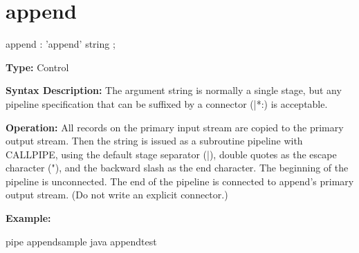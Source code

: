 \section{append}
\begin{shaded}
\begin{rail}
  append : 'append' string
  ;
\end{rail}
\end{shaded}

\textbf{Type:} Control

\textbf{Syntax Description:} The argument string is normally a single stage, but any pipeline
specification that can be suffixed by a connector (|*:) is acceptable.

\textbf{Operation:} All records on the primary input stream are copied
to the primary output stream. Then the string is issued as a
subroutine pipeline with CALLPIPE, using the default stage separator
(|), double quotes as the escape character ("), and the backward slash
as the end character. The beginning of the pipeline is
unconnected. The end of the pipeline is connected to append’s primary
output stream. (Do not write an explicit connector.)

\textbf{Example:}

 
\bash[stdout]
pipe appendsample
\END
\bash[stdout]
java appendtest
\END


